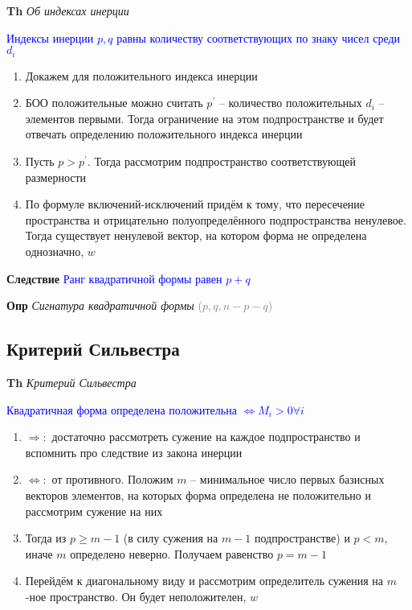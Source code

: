 \documentclass[a4paper, 14pt]{article}
\begin{document}
    \textbf{Th} \textit{Об индексах инерции}
    
    \textcolor{blue}{Индексы инерции $p, q$ равны количеству соответствующих по знаку чисел среди $d_i$}
    
    \begin{enumerate}
        \item Докажем для положительного индекса инерции
        \item БОО положительные можно считать $p^{'}$ -- количество положительных $d_i$ -- элементов первыми.
        Тогда ограничение на этом подпространстве и будет отвечать определению положительного индекса инерции
        \item Пусть $p > p^{'}$.
        Тогда рассмотрим подпространство соответствующей размерности
        \item По формуле включений-исключений придём к тому, что пересечение пространства и отрицательно
        полуопределённого подпространства ненулевое.
        Тогда существует ненулевой вектор, на котором форма не определена однозначно, $w$
    \end{enumerate}
    
    \textbf{Следствие} \textcolor{blue}{Ранг квадратичной формы равен $p + q$}
    
    \textbf{Опр} \textit{Сигнатура квадратичной формы} \textcolor{gray}{($p, q, n - p - q$)}
    
    \subsection{Критерий Сильвестра}
    
    \textbf{Th} \textit{Критерий Сильвестра}
    
    \textcolor{blue}{Квадратичная форма определена положительна $\Leftrightarrow M_i > 0 \forall i$}
    
    \begin{enumerate}
        \item $\Rightarrow:$ достаточно рассмотреть сужение на каждое подпространство и вспомнить про следствие из
        закона инерции
        \item $\Leftrightarrow:$ от противного.
        Положим $m$ -- минимальное число первых базисных векторов элементов, на которых форма определена не
        положительно и рассмотрим сужение на них
        \item Тогда из $p \geq m - 1$ (в силу сужения на $m - 1$ подпространстве) и $p < m$, иначе $m$ определено
        неверно.
        Получаем равенство $p = m - 1$
        \item Перейдём к диагональному виду и рассмотрим определитель сужения на $m$-ное пространство.
        Он будет неположителен, $w$
    \end{enumerate}
    
\end{document}
